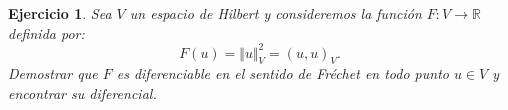 \documentclass[11pt]{report}
\newtheorem{ex}{Ejercicio}
\newenvironment{solution}{\begin{proof}[Solución]}{\end{proof}}
\newcommand{\inner}[2]{( #1, #2 )_V}
\newcommand{\norma}[1]{\Vert #1 \Vert_V}
\begin{document}
\begin{ex}
Sea $V$ un espacio de Hilbert y consideremos la función $F: V \to \mathbb{R}$ definida por:
\begin{equation*}
F(u) = \norma{u}^2 = \inner{u}{u}.
\end{equation*}
Demostrar que $F$ es diferenciable en el sentido de Fréchet en todo punto $u \in V$ y encontrar su diferencial.
\end{ex}




\end{document}
